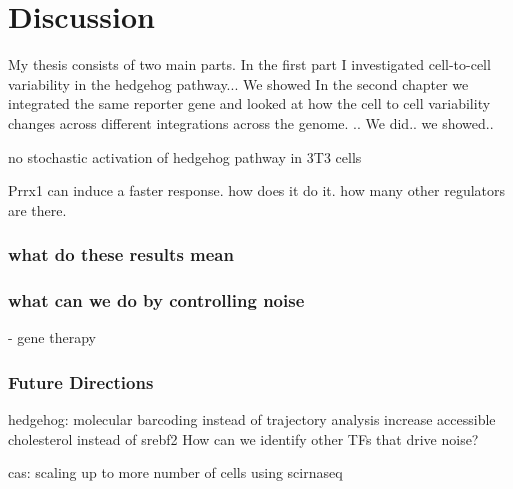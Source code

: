 \chapter{Discussion}
\label{chap:conclusion}
\tightlists


My thesis consists of two main parts. 
In the first part I investigated cell-to-cell variability in the hedgehog pathway... We showed
In the second chapter we integrated the same reporter gene and looked at how the cell to cell variability changes across 
different integrations across the genome. .. We did.. we showed.. 

no stochastic activation of hedgehog pathway in 3T3 cells

Prrx1 can induce a faster response. how does it do it. how many other regulators are there.

\subsection{what do these results mean}


\subsection{what can we do by controlling noise}
- gene therapy

\subsection{Future Directions}
hedgehog:
molecular barcoding instead of trajectory analysis
increase accessible cholesterol instead of srebf2
How can we identify other TFs that drive noise?



cas:
scaling up to more number of cells using scirnaseq


